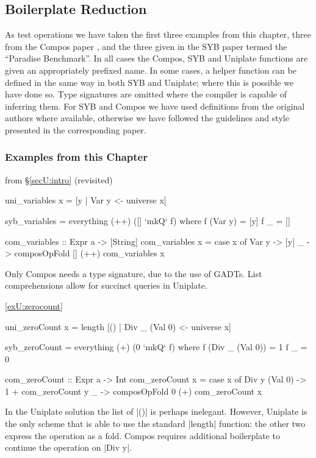 \subsection{Boilerplate Reduction}
\label{secU:results_boilerplate}

As test operations we have taken the first three examples from this chapter, three from the Compos paper \citep{bringert:compos}, and the three given in the SYB paper \citep{lammel:syb} termed the ``Paradise Benchmark''. In all cases the Compos, SYB and Uniplate functions are given an appropriately prefixed name. In some cases, a helper function can be defined in the same way in both SYB and Uniplate; where this is possible we have done so. Type signatures are omitted where the compiler is capable of inferring them. For SYB and Compos we have used definitions from the original authors where available, otherwise we have followed the guidelines and style presented in the corresponding paper.

\subsubsection{Examples from this Chapter}

\begin{exampleany}{from \S\ref{secU:intro} (revisited)}

\ignore\begin{code}
uni_variables x = [y | Var y <- universe x]

syb_variables = everything (++) ([] `mkQ` f)
    where  f (Var y)  = [y]
           f _        = []

com_variables :: Expr a -> [String]
com_variables x = case x of
    Var y -> [y]
    _ -> composOpFold [] (++) com_variables x
\end{code}

Only Compos needs a type signature, due to the use of GADTs. List comprehensions allow for succinct queries in Uniplate.
\end{exampleany}

\begin{examplerevisit}{\ref{exU:zerocount}}

\ignore\begin{code}
uni_zeroCount x = length [() | Div _ (Val 0) <- universe x]
\end{code}
\begin{onepage}
\ignore\begin{code}
syb_zeroCount = everything (+) (0 `mkQ` f)
    where  f (Div _ (Val 0))  = 1
           f _                = 0

com_zeroCount :: Expr a -> Int
com_zeroCount x = case x of
    Div y (Val 0) -> 1 + com_zeroCount y
    _ -> composOpFold 0 (+) com_zeroCount x
\end{code}
\end{onepage}

In the Uniplate solution the list of |()| is perhaps inelegant. However, Uniplate is the only scheme that is able to use the standard |length| function: the other two express the operation as a fold. Compos requires additional boilerplate to continue the operation on |Div y|.
\end{examplerevisit}

